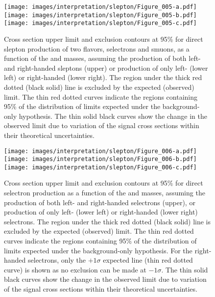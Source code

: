\begin{figure}[htbp]
\centering
\texttt{[image: images/interpretation/slepton/Figure\_005-a.pdf]} \\
\texttt{[image: images/interpretation/slepton/Figure\_005-b.pdf]}
\texttt{[image: images/interpretation/slepton/Figure\_005-c.pdf]}
\caption{\label{fig:TOT}
Cross section upper limit and exclusion contours at 95\% \CL for direct slepton production of two flavors, selectrons and smuons,
as a function of the \lsp and \slep masses, assuming the production of both left- and right-handed sleptons
(upper) or production of only left- (lower left) or right-handed (lower right).
The region under the thick red dotted (black solid) line is excluded by the expected (observed) limit.
The thin red dotted curves indicate the regions containing 95\% of the distribution of limits
expected under the background-only hypothesis.
The thin solid black curves show the change in the observed limit due to
variation of the signal cross sections within their theoretical uncertainties.
}
\end{figure}
\begin{figure}[htbp]
\centering
\texttt{[image: images/interpretation/slepton/Figure\_006-a.pdf]} \\
\texttt{[image: images/interpretation/slepton/Figure\_006-b.pdf]}
\texttt{[image: images/interpretation/slepton/Figure\_006-c.pdf]}
\caption{\label{fig:TOTee}
Cross section upper limit and exclusion contours at 95\% \CL for direct selectron production
as a function of the \lsp and \slep masses, assuming the production of both left- and right-handed selectrons
(upper), or production of only left- (lower left) or right-handed (lower right) selectrons.
The region under the thick red dotted (black solid) line is excluded by the expected (observed) limit.
The thin red dotted curves indicate the regions containing 95\% of the distribution of limits
expected under the background-only hypothesis. For the right-handed selectrons, only the $+1\sigma$ expected line (thin red dotted curve) is shown as no exclusion can be made at $-1\sigma$.
The thin solid black curves show the change in the observed limit due to
variation of the signal cross sections within their theoretical uncertainties.
}
\end{figure}
